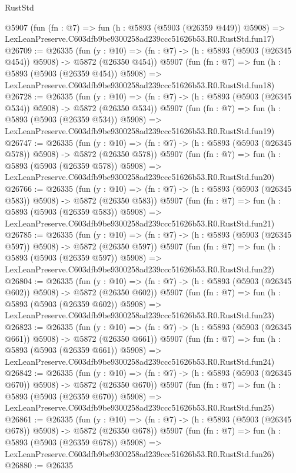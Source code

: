\begin{lexlean}{RustStd}
\begin{coremodule}
    @5907
    (fun (fn : @7) =>
    fun (h : @5893 (@5903 (@26359 @449)) @5908) =>
    LexLeanPreserve.C603dfb9be9300258ad239ccc51626b53.R0.RustStd.fun17)
@26709 := @26335
    (fun (y : @10) => (fn : @7) -> (h : @5893 (@5903 (@26345 @454)) @5908) -> @5872 (@26350 @454))
    @5907
    (fun (fn : @7) =>
    fun (h : @5893 (@5903 (@26359 @454)) @5908) =>
    LexLeanPreserve.C603dfb9be9300258ad239ccc51626b53.R0.RustStd.fun18)
@26728 := @26335
    (fun (y : @10) => (fn : @7) -> (h : @5893 (@5903 (@26345 @534)) @5908) -> @5872 (@26350 @534))
    @5907
    (fun (fn : @7) =>
    fun (h : @5893 (@5903 (@26359 @534)) @5908) =>
    LexLeanPreserve.C603dfb9be9300258ad239ccc51626b53.R0.RustStd.fun19)
@26747 := @26335
    (fun (y : @10) => (fn : @7) -> (h : @5893 (@5903 (@26345 @578)) @5908) -> @5872 (@26350 @578))
    @5907
    (fun (fn : @7) =>
    fun (h : @5893 (@5903 (@26359 @578)) @5908) =>
    LexLeanPreserve.C603dfb9be9300258ad239ccc51626b53.R0.RustStd.fun20)
@26766 := @26335
    (fun (y : @10) => (fn : @7) -> (h : @5893 (@5903 (@26345 @583)) @5908) -> @5872 (@26350 @583))
    @5907
    (fun (fn : @7) =>
    fun (h : @5893 (@5903 (@26359 @583)) @5908) =>
    LexLeanPreserve.C603dfb9be9300258ad239ccc51626b53.R0.RustStd.fun21)
@26785 := @26335
    (fun (y : @10) => (fn : @7) -> (h : @5893 (@5903 (@26345 @597)) @5908) -> @5872 (@26350 @597))
    @5907
    (fun (fn : @7) =>
    fun (h : @5893 (@5903 (@26359 @597)) @5908) =>
    LexLeanPreserve.C603dfb9be9300258ad239ccc51626b53.R0.RustStd.fun22)
@26804 := @26335
    (fun (y : @10) => (fn : @7) -> (h : @5893 (@5903 (@26345 @602)) @5908) -> @5872 (@26350 @602))
    @5907
    (fun (fn : @7) =>
    fun (h : @5893 (@5903 (@26359 @602)) @5908) =>
    LexLeanPreserve.C603dfb9be9300258ad239ccc51626b53.R0.RustStd.fun23)
@26823 := @26335
    (fun (y : @10) => (fn : @7) -> (h : @5893 (@5903 (@26345 @661)) @5908) -> @5872 (@26350 @661))
    @5907
    (fun (fn : @7) =>
    fun (h : @5893 (@5903 (@26359 @661)) @5908) =>
    LexLeanPreserve.C603dfb9be9300258ad239ccc51626b53.R0.RustStd.fun24)
@26842 := @26335
    (fun (y : @10) => (fn : @7) -> (h : @5893 (@5903 (@26345 @670)) @5908) -> @5872 (@26350 @670))
    @5907
    (fun (fn : @7) =>
    fun (h : @5893 (@5903 (@26359 @670)) @5908) =>
    LexLeanPreserve.C603dfb9be9300258ad239ccc51626b53.R0.RustStd.fun25)
@26861 := @26335
    (fun (y : @10) => (fn : @7) -> (h : @5893 (@5903 (@26345 @678)) @5908) -> @5872 (@26350 @678))
    @5907
    (fun (fn : @7) =>
    fun (h : @5893 (@5903 (@26359 @678)) @5908) =>
    LexLeanPreserve.C603dfb9be9300258ad239ccc51626b53.R0.RustStd.fun26)
@26880 := @26335

\end{coremodule}
\end{lexlean}
